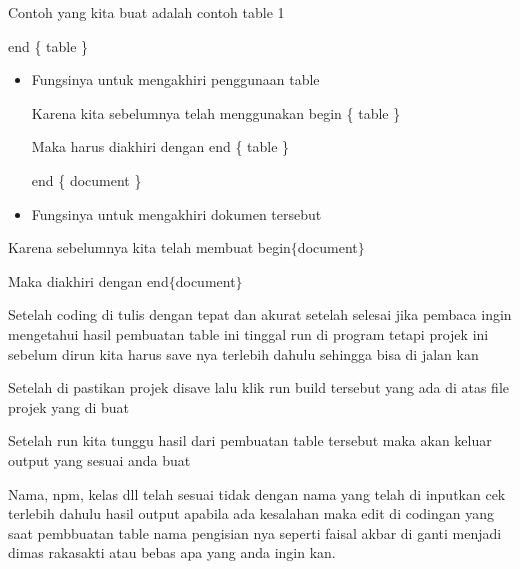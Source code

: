 \vspace{\baselineskip}
Contoh yang kita buat adalah contoh table 1\par

\vspace{\baselineskip}
\noindent end \{ table \} \par

\vspace{\baselineskip}
\begin{itemize}
	\item Fungsinya untuk mengakhiri penggunaan table\par
\vspace{\baselineskip}
Karena kita sebelumnya telah menggunakan begin \{ table \} \par

\vspace{\baselineskip}
Maka harus diakhiri dengan end \{ table \} \par

\vspace{\baselineskip}
end \{ document \} \par

\vspace{\baselineskip}
	\item Fungsinya untuk mengakhiri dokumen tersebut 
\end{itemize}\par


\vspace{\baselineskip}
\noindent Karena sebelumnya kita telah membuat begin$ \{ $document$ \} $\par


\noindent Maka diakhiri dengan end$ \{ $document$ \} $\par
\vspace{\baselineskip}
Setelah coding di tulis dengan tepat dan akurat setelah selesai jika pembaca ingin mengetahui hasil pembuatan table ini tinggal run di program tetapi projek ini sebelum dirun kita harus save nya terlebih dahulu sehingga bisa di jalan kan \par
\vspace{\baselineskip}
Setelah di pastikan projek disave lalu klik run build tersebut yang ada di atas file projek yang di buat\par
\vspace{\baselineskip}
Setelah run kita tunggu hasil dari pembuatan table tersebut maka akan keluar output yang sesuai anda buat \par
\vspace{\baselineskip}
Nama, npm, kelas dll telah sesuai tidak dengan nama yang telah di inputkan cek terlebih dahulu hasil output apabila ada kesalahan maka edit di codingan yang saat pembbuatan table nama pengisian nya seperti faisal akbar di ganti menjadi dimas rakasakti atau bebas apa yang anda ingin kan.\par

